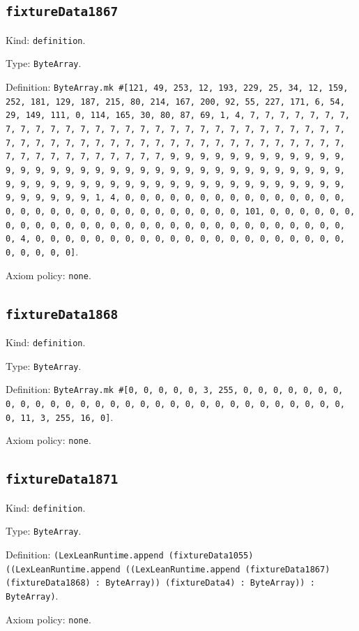 \documentclass[11pt]{article}
\begin{document}
\subsection*{\texttt{fixtureData1867}}
\noindent Kind: \texttt{definition}.\par
\noindent Type: \texttt{ByteArray}.\par
\noindent Definition: \texttt{ByteArray.mk \#[121, 49, 253, 12, 193, 229, 25, 34, 12, 159, 252, 181, 129, 187, 215, 80, 214, 167, 200, 92, 55, 227, 171, 6, 54, 29, 149, 111, 0, 114, 165, 30, 80, 87, 69, 1, 4, 7, 7, 7, 7, 7, 7, 7, 7, 7, 7, 7, 7, 7, 7, 7, 7, 7, 7, 7, 7, 7, 7, 7, 7, 7, 7, 7, 7, 7, 7, 7, 7, 7, 7, 7, 7, 7, 7, 7, 7, 7, 7, 7, 7, 7, 7, 7, 7, 7, 7, 7, 7, 7, 7, 7, 7, 7, 7, 7, 7, 7, 7, 7, 7, 9, 9, 9, 9, 9, 9, 9, 9, 9, 9, 9, 9, 9, 9, 9, 9, 9, 9, 9, 9, 9, 9, 9, 9, 9, 9, 9, 9, 9, 9, 9, 9, 9, 9, 9, 9, 9, 9, 9, 9, 9, 9, 9, 9, 9, 9, 9, 9, 9, 9, 9, 9, 9, 9, 9, 9, 9, 9, 9, 9, 9, 9, 9, 9, 1, 4, 0, 0, 0, 0, 0, 0, 0, 0, 0, 0, 0, 0, 0, 0, 0, 0, 0, 0, 0, 0, 0, 0, 0, 0, 0, 0, 0, 0, 0, 0, 0, 101, 0, 0, 0, 0, 0, 0, 0, 0, 0, 0, 0, 0, 0, 0, 0, 0, 0, 0, 0, 0, 0, 0, 0, 0, 0, 0, 0, 0, 0, 0, 4, 0, 0, 0, 0, 0, 0, 0, 0, 0, 0, 0, 0, 0, 0, 0, 0, 0, 0, 0, 0, 0, 0, 0, 0, 0, 0]}.\par
\noindent Axiom policy: \texttt{none}.\par
\subsection*{\texttt{fixtureData1868}}
\noindent Kind: \texttt{definition}.\par
\noindent Type: \texttt{ByteArray}.\par
\noindent Definition: \texttt{ByteArray.mk \#[0, 0, 0, 0, 0, 3, 255, 0, 0, 0, 0, 0, 0, 0, 0, 0, 0, 0, 0, 0, 0, 0, 0, 0, 0, 0, 0, 0, 0, 0, 0, 0, 0, 0, 0, 0, 0, 0, 11, 3, 255, 16, 0]}.\par
\noindent Axiom policy: \texttt{none}.\par
\subsection*{\texttt{fixtureData1871}}
\noindent Kind: \texttt{definition}.\par
\noindent Type: \texttt{ByteArray}.\par
\noindent Definition: \texttt{(LexLeanRuntime.append (fixtureData1055) ((LexLeanRuntime.append ((LexLeanRuntime.append (fixtureData1867) (fixtureData1868) : ByteArray)) (fixtureData4) : ByteArray)) : ByteArray)}.\par
\noindent Axiom policy: \texttt{none}.\par
\end{document}
